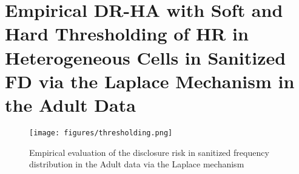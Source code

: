 \documentclass[10pt,journal,compsoc]{IEEEtran}
\begin{document}
\section{\large Empirical DR-HA with Soft and Hard Thresholding of HR in  Heterogeneous Cells in Sanitized FD via the  Laplace Mechanism in the Adult Data}\label{app:thresholding}\vspace{-6pt}
\begin{figure}[!htb]
\centering\vspace{-6pt}
\texttt{[image: figures/thresholding.png]}
\vspace{-6pt}
\caption{Empirical evaluation of the disclosure risk in sanitized frequency distribution in the Adult data via the Laplace mechanism}\label{fig:thresholding}
\end{figure}
\end{document}
